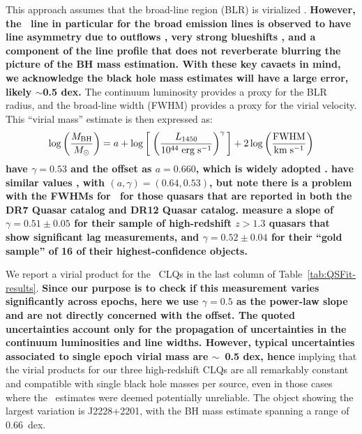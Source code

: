 \documentclass[fleqn,usenatbib]{mnras}
\begin{document}
This approach assumes that the broad-line region (BLR) is
virialized \citep[e.g.][]{Shen2011, Calderone2017}.
{\bf However, the \civ\ line in particular for the broad emission lines is
observed to have
line asymmetry due to outflows \citep[e.g.,][]{Gaskell1982}, 
very strong blueshifts \citep[as mentioned in the Introduction, see ][]{Richards2011},
and a component of the line profile that does not reverberate \citep[][]{Denney2012}
blurring the picture of the BH mass estimation.
With these key cavaets in mind, we acknowledge the black hole mass estimates
will have a large error, likely $\sim$0.5 dex.
}
The continuum
luminosity provides a proxy for the BLR radius, and the broad-line
width (FWHM) provides a proxy for the virial velocity.  This ``virial
mass'' estimate is then expressed as:
{\bf
\begin{equation}
  \log \left( \frac{M_{\rm BH}}{M_{\odot}} \right)  = a + \log  \left[ \; \left(  \frac{L_{1450}} {10^{44} \; {\rm erg \; s^{-1}}}\right)^{\gamma} \, \right] + 2 \log \left( \frac{\rm {FWHM}}{{\rm km\; s^{-1}}} \right)
  \label{eqn:virial_masses}
\end{equation}
\citet{VestergaardPeterson2006} have $\gamma=0.53$ and the offset as $a=0.660$, 
which is widely adopted \citep[e.g.,][]{Chen2019, Yao2019}.
\citet{Kozlowski2017} have similar values \citet{VestergaardPeterson2006} , with $(a,\gamma)=(0.64, 0.53)$,
but note there is a problem with the FWHMs for \civ\ for those quasars that are reported in
both the DR7 Quasar catalog and DR12 Quasar catalog.
\citet{Grier2019} measure a slope of $\gamma=0.51\pm0.05$ for their sample of high-redshift
$z>1.3$ quasars that show significant lag measurements,
and  $\gamma=0.52\pm0.04$ for their ``gold sample'' of 16 of
their highest-confidence objects. }

We report a virial product for the \civ\ CLQs in the last column of
Table~\ref{tab:QSFit-results}.  {\bf Since our purpose is to check if
this measurement varies significantly across epochs, here we use
$\gamma=0.5$ as the power-law slope and are not directly concerned
with the offset.
 The quoted uncertainties account only for the propagation of uncertainties in the continuum luminosities and line widths.  However, typical uncertainties associated to single epoch virial mass are $\sim$~0.5 dex, hence} implying that the virial products for our three
high-redshift CLQs are all remarkably constant and compatible with
single black hole masses per source, even in those cases where the
\civ\ estimates were deemed potentially unreliable. The object showing
the largest variation is J2228+2201, with the BH mass estimate spanning a range of 0.66~dex.
\end{document}
